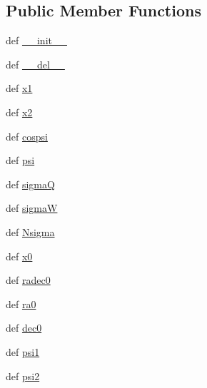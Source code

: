 \subsection*{Public Member Functions}
\begin{DoxyCompactItemize}
\item 
def \hyperlink{classamonpy_1_1anal_1_1cluster_1_1_fisher__doublet_a72644fb3ed632812c691ce69b0018d8e}{\-\_\-\-\_\-init\-\_\-\-\_\-}
\item 
def \hyperlink{classamonpy_1_1anal_1_1cluster_1_1_fisher__doublet_aaab484ff4406acbf80fc5765fd17dfc5}{\-\_\-\-\_\-del\-\_\-\-\_\-}
\item 
def \hyperlink{classamonpy_1_1anal_1_1cluster_1_1_fisher__doublet_acc990236480417906293ffd2abd469c7}{x1}
\item 
def \hyperlink{classamonpy_1_1anal_1_1cluster_1_1_fisher__doublet_a95b5fa4a4f626ce07c3b5ccd024b18bb}{x2}
\item 
def \hyperlink{classamonpy_1_1anal_1_1cluster_1_1_fisher__doublet_a6882d1939550f0aaf29b27dd6ea64bfa}{cospsi}
\item 
def \hyperlink{classamonpy_1_1anal_1_1cluster_1_1_fisher__doublet_a4e67448431e693c8a026edff39cd0890}{psi}
\item 
def \hyperlink{classamonpy_1_1anal_1_1cluster_1_1_fisher__doublet_af2325740b9f8f3b5d9a13e01ee7dcce2}{sigma\-Q}
\item 
def \hyperlink{classamonpy_1_1anal_1_1cluster_1_1_fisher__doublet_a200eb57bc5056fda25e267fd14661230}{sigma\-W}
\item 
def \hyperlink{classamonpy_1_1anal_1_1cluster_1_1_fisher__doublet_aabc3047da8bb90574a3a880d11173f3f}{Nsigma}
\item 
def \hyperlink{classamonpy_1_1anal_1_1cluster_1_1_fisher__doublet_a03e6887824f72ce70d6e1246d780d60e}{x0}
\item 
def \hyperlink{classamonpy_1_1anal_1_1cluster_1_1_fisher__doublet_aaff22a7e1496bd8515363bb17cb98fa2}{radec0}
\item 
def \hyperlink{classamonpy_1_1anal_1_1cluster_1_1_fisher__doublet_a676252695dc679535a2f58f9bf866bbf}{ra0}
\item 
def \hyperlink{classamonpy_1_1anal_1_1cluster_1_1_fisher__doublet_ac7a3963ac566366f057eb0ba05812afb}{dec0}
\item 
def \hyperlink{classamonpy_1_1anal_1_1cluster_1_1_fisher__doublet_a387f346ca00da95c8ed71a75feb28991}{psi1}
\item 
def \hyperlink{classamonpy_1_1anal_1_1cluster_1_1_fisher__doublet_a22daeaad3c872ef7eff91da26c38a5fb}{psi2}
\end{DoxyCompactItemize}
